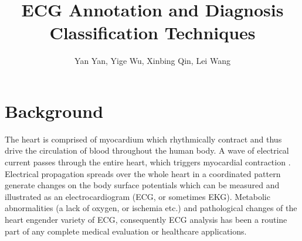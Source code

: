\documentclass[graybox]{svmult}
\begin{document}
\title*{ECG Annotation and Diagnosis Classification Techniques}
\author{Yan Yan, Yige Wu, Xinbing Qin, Lei Wang}
%
%




\maketitle
{}



\section{Background}
The heart is comprised of myocardium which rhythmically contract and thus drive the circulation of blood throughout the human body.
A wave of electrical current passes through the entire heart, which triggers myocardial contraction \citep{clifford2006advanced}.
Electrical propagation spreads over the whole heart in a coordinated pattern generate changes on the body surface potentials which can be measured and illustrated as an electrocardiogram (ECG, or sometimes EKG).
Metabolic abnormalities (a lack of oxygen, or ischemia etc.) and pathological changes of the heart engender variety of ECG, consequently ECG analysis has been a routine part of any complete medical evaluation or healthcare applications.
\end{document}
